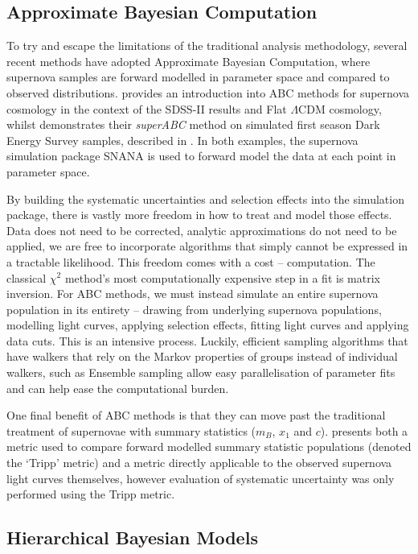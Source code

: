 \documentclass[a4paper,fleqn,usenatbib]{mnras}
\begin{document}
\subsection{Approximate Bayesian Computation}

To try and escape the limitations of the traditional analysis methodology, several recent methods have adopted Approximate Bayesian Computation, where supernova samples are forward modelled in parameter space and compared to observed distributions. \citet{Weyant2013} provides an introduction into ABC methods for supernova cosmology in the context of the SDSS-II results \citep{Sako2014} and Flat $\Lambda$CDM cosmology, whilst \citet{Jennings2016} demonstrates their \textit{superABC} method on simulated first season Dark Energy Survey samples, described in \citet{Kessler2015}. In both examples, the supernova simulation package SNANA \citep{Kessler2009a} is used to forward model the data at each point in parameter space.

By building the systematic uncertainties and selection effects into the simulation package, there is vastly more freedom in how to treat and model those effects. Data does not need to be corrected, analytic approximations do not need to be applied, we are free to incorporate algorithms that simply cannot be expressed in a tractable likelihood. This freedom comes with a cost -- computation. The classical $\chi^2$ method's most computationally expensive step in a fit is matrix inversion. For ABC methods, we must instead simulate an entire supernova population in its entirety -- drawing from underlying supernova populations, modelling light curves, applying selection effects, fitting light curves and applying data cuts. This is an intensive process. Luckily, efficient sampling algorithms that have walkers that rely on the Markov properties of groups instead of individual walkers, such as Ensemble sampling \citep{Foreman-Mackey2013} allow easy parallelisation of parameter fits and can help ease the computational burden.

One final benefit of ABC methods is that they can move past the traditional treatment of supernovae with summary statistics ($m_B$, $x_1$ and $c$). \citet{Jennings2016} presents both a metric used to compare forward modelled summary statistic populations (denoted the `Tripp' metric) and a metric directly applicable to the observed supernova light curves themselves, however evaluation of systematic uncertainty was only performed using the Tripp metric.

\subsection{Hierarchical Bayesian Models}
\end{document}
